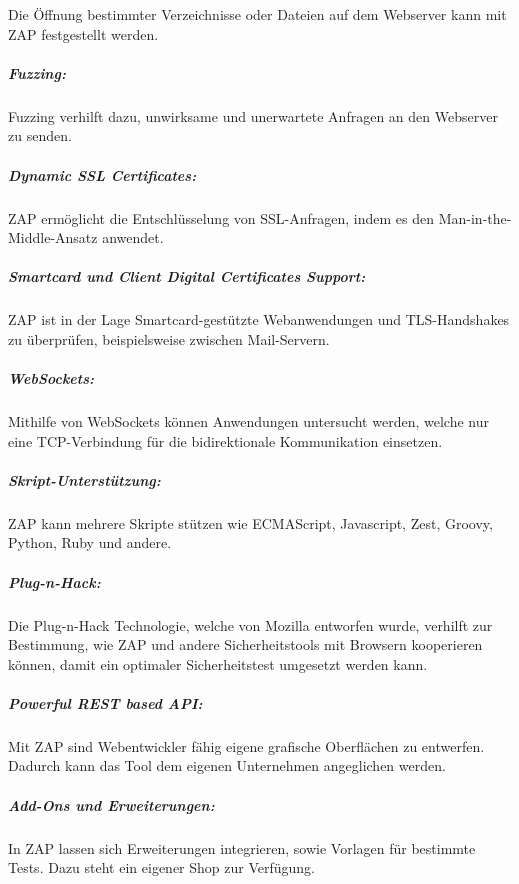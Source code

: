 Die Öffnung bestimmter Verzeichnisse oder Dateien auf dem Webserver kann mit ZAP festgestellt werden. 

\subparagraph{Fuzzing:}

Fuzzing verhilft dazu, unwirksame und unerwartete Anfragen an den Webserver zu senden. 

\subparagraph{Dynamic SSL Certificates:}

ZAP ermöglicht die Entschlüsselung von SSL-Anfragen, indem es den Man-in-the-Middle-Ansatz anwendet.

\subparagraph{Smartcard und Client Digital Certificates Support:}

ZAP ist in der Lage Smartcard-gestützte Webanwendungen und TLS-Handshakes zu überprüfen, beispielsweise zwischen Mail-Servern.

\subparagraph{WebSockets:}

Mithilfe von WebSockets können Anwendungen untersucht werden, welche nur eine TCP-Verbindung für die bidirektionale Kommunikation einsetzen. 

\subparagraph{Skript-Unterstützung:}

ZAP kann mehrere Skripte stützen wie ECMAScript, Javascript, Zest, Groovy,  Python, Ruby und andere. 

\subparagraph{Plug-n-Hack:}

Die Plug-n-Hack Technologie, welche von Mozilla entworfen wurde, verhilft zur Bestimmung, wie ZAP und andere Sicherheitstools mit Browsern kooperieren können, damit ein optimaler Sicherheitstest umgesetzt werden kann. 

\subparagraph{Powerful REST based API:}

Mit ZAP sind Webentwickler fähig eigene grafische Oberflächen zu entwerfen. Dadurch kann das Tool dem eigenen Unternehmen angeglichen werden. 

\subparagraph{Add-Ons und Erweiterungen:}

In ZAP lassen sich Erweiterungen integrieren, sowie Vorlagen für bestimmte Tests. Dazu steht ein eigener Shop zur Verfügung.
